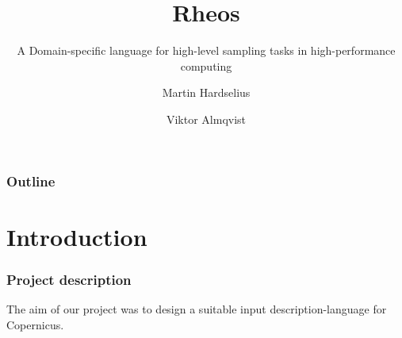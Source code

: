 \documentclass[10pt]{beamer}
\begin{document}
\title{Rheos}
\subtitle{A Domain-specific language for high-level sampling tasks in
  high-performance computing}
\author[Hardselius \and Almqvist]{Martin Hardselius \and Viktor Almqvist}


\begin{frame}
  \titlepage
\end{frame}


\begin{frame}
\frametitle{Outline}
\pause
\tableofcontents[pausesections]
\end{frame}


\section{Introduction}
\begin{frame}
\frametitle{Project description}

The aim of our project was to design a suitable input
description-language for Copernicus.

\end{frame}


%
%
%
%
\end{document}
